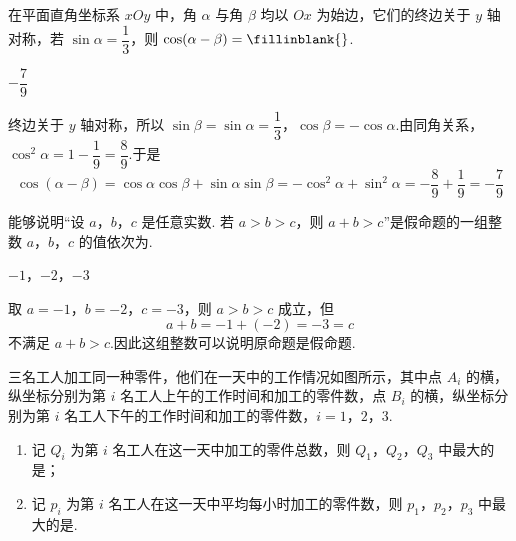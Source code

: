 \begin{problem}
在平面直角坐标系 \(xOy\) 中，角 \(\alpha\) 与角 \(\beta\) 均以 \(Ox\) 为始边，它们的终边关于 \(y\) 轴对称，若 \(\sin\alpha=\dfrac13\)，则 \(\cos(\alpha-\beta)=\fillinblank{}\).
\end{problem}

\begin{answer}
\(-\dfrac{7}{9}\)
\end{answer}

\begin{solution}
终边关于 \(y\) 轴对称，所以 \(\sin\beta=\sin\alpha=\dfrac13\)，\(\cos\beta=-\cos\alpha\).由同角关系，\(\cos^2\alpha=1-\dfrac19=\dfrac89\).于是
\[
\cos(\alpha-\beta)=\cos\alpha\cos\beta+\sin\alpha\sin\beta=-\cos^2\alpha+\sin^2\alpha=-\frac89+\frac19=-\frac79
\]
\end{solution}

\begin{problem}
能够说明“设 \(a\)，\(b\)，\(c\) 是任意实数. 若 \(a>b>c\)，则 \(a+b>c\)”是假命题的一组整数 \(a\)，\(b\)，\(c\) 的值依次为\fillinblank{}.
\end{problem}

\begin{answer}
\(-1\)，\(-2\)，\(-3\)
\end{answer}

\begin{solution}
取 \(a=-1\)，\(b=-2\)，\(c=-3\)，则 \(a>b>c\) 成立，但
\[
a+b=-1+(-2)=-3=c
\]
不满足 \(a+b>c\).因此这组整数可以说明原命题是假命题.
\end{solution}

\begin{problem}
三名工人加工同一种零件，他们在一天中的工作情况如图所示，其中点 \(A_i\) 的横，纵坐标分别为第 \(i\) 名工人上午的工作时间和加工的零件数，点 \(B_i\) 的横，纵坐标分别为第 \(i\) 名工人下午的工作时间和加工的零件数，\(i=1\)，\(2\)，\(3\).

\begin{enumerate}
\item 记 \(Q_i\) 为第 \(i\) 名工人在这一天中加工的零件总数，则 \(Q_1\)，\(Q_2\)，\(Q_3\) 中最大的是\fillinblank{}；
\item 记 \(p_i\) 为第 \(i\) 名工人在这一天中平均每小时加工的零件数，则 \(p_1\)，\(p_2\)，\(p_3\) 中最大的是\fillinblank{}.
\end{enumerate}

\end{problem}


